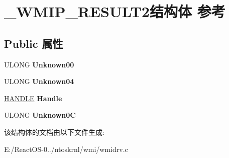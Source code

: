 \hypertarget{struct___w_m_i_p___r_e_s_u_l_t2}{}\section{\+\_\+\+W\+M\+I\+P\+\_\+\+R\+E\+S\+U\+L\+T2结构体 参考}
\label{struct___w_m_i_p___r_e_s_u_l_t2}
\subsection*{Public 属性}
\begin{DoxyCompactItemize}
\item 
\mbox{\label{struct___w_m_i_p___r_e_s_u_l_t2_a196b5431ed519bf4fbc350a4caf6013f}} 
U\+L\+O\+NG {\bfseries Unknown00}
\item 
\mbox{\label{struct___w_m_i_p___r_e_s_u_l_t2_aff69c6c7b8e54e2b128f265d97a06013}} 
U\+L\+O\+NG {\bfseries Unknown04}
\item 
\mbox{\label{struct___w_m_i_p___r_e_s_u_l_t2_a9c310494090e5614d853e156a128bb36}} 
\hyperlink{interfacevoid}{H\+A\+N\+D\+LE} {\bfseries Handle}
\item 
\mbox{\label{struct___w_m_i_p___r_e_s_u_l_t2_a1e77a9f1c6306ae63c9a9cfb82dfff2a}} 
U\+L\+O\+NG {\bfseries Unknown0C}
\end{DoxyCompactItemize}


该结构体的文档由以下文件生成\+:\begin{DoxyCompactItemize}
\item 
E\+:/\+React\+O\+S-\/0../ntoskrnl/wmi/wmidrv.\+c\end{DoxyCompactItemize}
